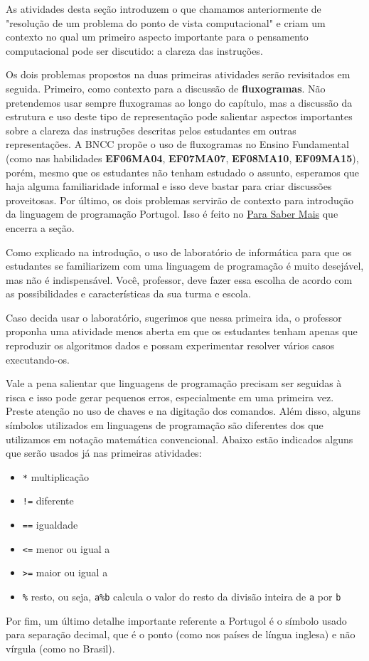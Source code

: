 \def\currentcolor{session1}
\begin{texto}
{
As atividades desta seção introduzem o que chamamos anteriormente de "resolução de um problema do ponto de vista computacional"{} e criam um contexto no qual um primeiro aspecto importante para o pensamento computacional pode ser discutido: a clareza das instruções.

Os dois problemas propostos na duas primeiras atividades serão revisitados em seguida. Primeiro, como contexto para a discussão de \textbf{fluxogramas}. Não pretendemos usar sempre fluxogramas ao longo do capítulo, mas a discussão da estrutura e uso deste tipo de representação pode salientar aspectos importantes sobre a clareza das instruções descritas pelos estudantes em outras representações. A BNCC propõe o uso de fluxogramas no Ensino Fundamental (como nas habilidades \textbf{EF06MA04}, \textbf{EF07MA07}, \textbf{EF08MA10}, \textbf{EF09MA15}), porém, mesmo que os estudantes não tenham estudado o assunto, esperamos que haja alguma familiaridade informal e isso deve bastar para criar discussões proveitosas. Por último, os dois problemas servirão de contexto para introdução da linguagem de programação Portugol. Isso é feito no \hyperref[comp-know1]{Para Saber Mais} que encerra a seção.

Como explicado na introdução, o uso de laboratório de informática para que os estudantes se familiarizem com uma linguagem de programação é muito desejável, mas não é indispensável. Você, professor, deve fazer essa escolha de acordo com as possibilidades e características da sua turma e escola.

Caso decida usar o laboratório, sugerimos que nessa primeira ida, o professor proponha uma atividade menos aberta em que os estudantes tenham apenas que reproduzir os algoritmos dados e possam experimentar resolver vários casos executando-os.

Vale a pena salientar que linguagens de programação precisam ser seguidas à risca e isso pode gerar pequenos erros, especialmente em uma primeira vez. Preste atenção no uso de chaves e na digitação dos comandos. Além disso, alguns símbolos utilizados em linguagens de programação são diferentes dos que utilizamos em notação matemática convencional. Abaixo estão indicados alguns que serão usados já nas primeiras atividades:

\begin{itemize}
\item \texttt{*} multiplicação
\item \texttt{!=} diferente
\item \texttt{==} igualdade
\item \texttt{<=} menor ou igual a
\item \texttt{>=} maior ou igual a
\item \texttt{\%} resto, ou seja, \texttt{a\%b} calcula o valor do resto da divisão inteira de \texttt{a} por \texttt{b}
\end{itemize}

Por fim, um último detalhe importante referente a Portugol é o símbolo usado para separação decimal, que é o ponto (como nos países de língua inglesa) e não vírgula (como no Brasil).
}
\end{texto}
